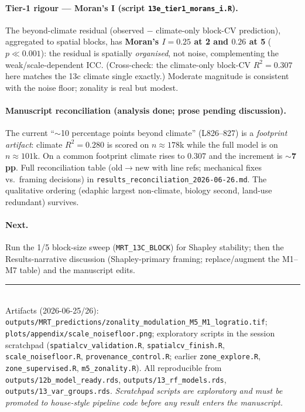 \documentclass[11pt,a4paper]{article}
\begin{document}
\paragraph{Tier-1 rigour --- Moran's I (script \texttt{13e\_tier1\_morans\_i.R}).} The
beyond-climate residual (observed $-$ climate-only block-CV prediction), aggregated
to spatial blocks, has \textbf{Moran's $I=0.25$ at 2\textdegree{} and $0.26$ at
5\textdegree{}} ($p \ll 0.001$): the residual is spatially \emph{organised}, not
noise, complementing the weak/scale-dependent ICC. (Cross-check: the climate-only
block-CV $R^2=0.307$ here matches the 13c climate single exactly.) Moderate
magnitude is consistent with the noise floor; zonality is real but modest.

\paragraph{Manuscript reconciliation (analysis done; prose pending discussion).} The
current ``$\sim$10 percentage points beyond climate'' (L826--827) is a
\emph{footprint artifact}: climate $R^2=0.280$ is scored on $n\approx178$k while the
full model is on $n\approx101$k. On a common footprint climate rises to $0.307$ and
the increment is \textbf{$\sim$7 pp}. Full reconciliation table (old$\to$new with
line refs; mechanical fixes vs.\ framing decisions) in
\texttt{results\_reconciliation\_2026-06-26.md}. The qualitative ordering (edaphic
largest non-climate, biology second, land-use redundant) survives.

\paragraph{Next.} Run the 1\textdegree{}/5\textdegree{} block-size sweep
(\texttt{MRT\_13C\_BLOCK}) for Shapley stability; then the Results-narrative
discussion (Shapley-primary framing; replace/augment the M1--M7 table) and the
manuscript edits.

\bigskip
\noindent\rule{\linewidth}{0.4pt}\\
{\footnotesize Artifacts (2026-06-25/26):
\texttt{outputs/MRT\_predictions/zonality\_modulation\_M5\_M1\_logratio.tif};
\texttt{plots/appendix/scale\_noisefloor.png}; exploratory scripts in the session
scratchpad (\texttt{spatialcv\_validation.R}, \texttt{spatialcv\_finish.R},
\texttt{scale\_noisefloor.R}, \texttt{provenance\_control.R}; earlier
\texttt{zone\_explore.R}, \texttt{zone\_supervised.R}, \texttt{m5\_zonality.R}).
All reproducible from \texttt{outputs/12b\_model\_ready.rds},
\texttt{outputs/13\_rf\_models.rds}, \texttt{outputs/13\_var\_groups.rds}.
\emph{Scratchpad scripts are exploratory and must be promoted to house-style
pipeline code before any result enters the manuscript.}}
\end{document}
